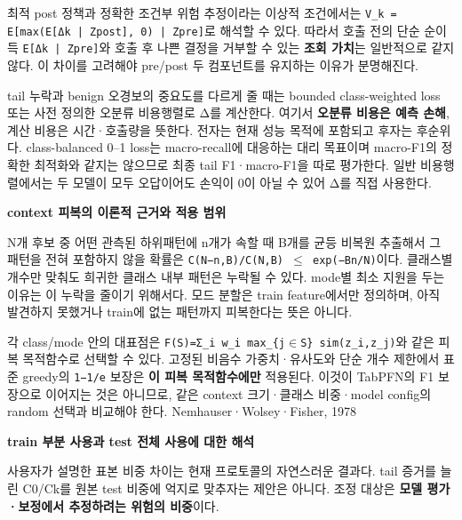 최적 post 정책과 정확한 조건부 위험 추정이라는 이상적 조건에서는 \texttt{V\_\allowbreak{}\allowbreak{}k =\allowbreak{}\allowbreak{} E[\allowbreak{}max(E[Δk\allowbreak{} | Zpost\allowbreak{}],\allowbreak{} 0) | \allowbreak{}Zpre]}로 해석할 수 있다. 따라서 호출 전의 단순 순이득 \texttt{E[Δk | Z\allowbreak{}pre]}와 호출 후 나쁜 결정을 거부할 수 있는 \textbf{조회 가치}는 일반적으로 같지 않다. 이 차이를 고려해야 pre/\allowbreak{}post 두 컴포넌트를 유지하는 이유가 분명해진다.

tail 누락과 benign 오경보의 중요도를 다르게 줄 때는 bounded class-weighted loss 또는 사전 정의한 오분류 비용행렬로 Δ를 계산한다. 여기서 \textbf{오분류 비용은 예측 손해}, 계산 비용은 시간·호출량을 뜻한다. 전자는 현재 성능 목적에 포함되고 후자는 후순위다. class-balanced 0–1 loss는 macro-recall에 대응하는 대리 목표이며 macro-F1의 정확한 최적화와 같지는 않으므로 최종 tail F1·macro-F1을 따로 평가한다. 일반 비용행렬에서는 두 모델이 모두 오답이어도 손익이 0이 아닐 수 있어 Δ를 직접 사용한다.

\textbf{context 피복의 이론적 근거와 적용 범위}

N개 후보 중 어떤 관측된 하위패턴에 n개가 속할 때 B개를 균등 비복원 추출해서 그 패턴을 전혀 포함하지 않을 확률은 \texttt{C(N−n,\allowbreak{}B)\allowbreak{}/\allowbreak{}\allowbreak{}C(N,\allowbreak{}B) \allowbreak{}\ensuremath{\leq} exp(−B\allowbreak{}n/\allowbreak{}\allowbreak{}N)}이다. 클래스별 개수만 맞춰도 희귀한 클래스 내부 패턴은 누락될 수 있다. mode별 최소 지원을 두는 이유는 이 누락을 줄이기 위해서다. 모드 분할은 train feature에서만 정의하며, 아직 발견하지 못했거나 train에 없는 패턴까지 피복한다는 뜻은 아니다.

각 class/\allowbreak{}mode 안의 대표점은 \texttt{F(S)=\allowbreak{}\allowbreak{}Σ\_\allowbreak{}\allowbreak{}i\allowbreak{} w\_\allowbreak{}\allowbreak{}i max\allowbreak{}\_\allowbreak{}\allowbreak{}\{\allowbreak{}j\ensuremath{\in}S\}\allowbreak{} s\allowbreak{}im(z\_\allowbreak{}\allowbreak{}i,\allowbreak{}z\allowbreak{}\_\allowbreak{}\allowbreak{}j)}와 같은 피복 목적함수로 선택할 수 있다. 고정된 비음수 가중치·유사도와 단순 개수 제한에서 표준 greedy의 \texttt{1−1/\allowbreak{}\allowbreak{}e} 보장은 \textbf{이 피복 목적함수에만} 적용된다. 이것이 TabPFN의 F1 보장으로 이어지는 것은 아니므로, 같은 context 크기·클래스 비중·model config의 random 선택과 비교해야 한다. Nemhauser·Wolsey·Fisher, 1978

\textbf{train 부분 사용과 test 전체 사용에 대한 해석}

사용자가 설명한 표본 비중 차이는 현재 프로토콜의 자연스러운 결과다. tail 증거를 늘린 C0/\allowbreak{}Ck를 원본 test 비중에 억지로 맞추자는 제안은 아니다. 조정 대상은 \textbf{모델 평가·보정에서 추정하려는 위험의 비중}이다.

